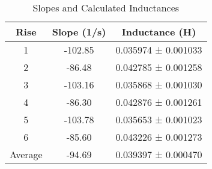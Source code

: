 \begin{table}[h]
\centering
\begin{tabular}{|c|c|c|}
\hline
Rise & Slope (1/s) & Inductance (H) \\
\hline
1 & -102.85 & 0.035974 ± 0.001033 \\
2 & -86.48 & 0.042785 ± 0.001258 \\
3 & -103.16 & 0.035868 ± 0.001030 \\
4 & -86.30 & 0.042876 ± 0.001261 \\
5 & -103.78 & 0.035653 ± 0.001023 \\
6 & -85.60 & 0.043226 ± 0.001273 \\
\hline
Average & -94.69 & 0.039397 ± 0.000470 \\
\hline
\end{tabular}
\caption{Slopes and Calculated Inductances}
\label{tab:inductances}
\end{table}

